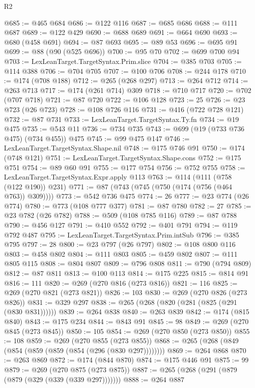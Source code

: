 \begin{lexlean}{R2}
\begin{coremodule}
@685 := @465 @684
@686 := @122 @116
@687 := @685 @686
@688 := @111 @687
@689 := @122 @429
@690 := @688 @689
@691 := @664 @690
@693 := @680 (@458 @691)
@694 := @87 @693
@695 := @89 @53
@696 := @695 @91
@699 := @88 (@90 (@525 @696))
@700 := @95 @70
@702 := @699 @700 @94
@703 := LexLeanTarget.TargetSyntax.Prim.slice
@704 := @385 @703
@705 := @114 @388
@706 := @704 @705
@707 := @100 @706
@708 := @244 @178
@710 := @174 (@708 @188)
@712 := @265 (@268 @297)
@713 := @264 @712
@714 := @263 @713
@717 := @174 (@261 @714) @309
@718 := @710 @717
@720 := @702 (@707 @718)
@721 := @87 @720
@722 := @106 @128
@723 := 25
@726 := @23 @723 (@26 @723)
@728 := @108 @726 @116
@731 := @416 (@722 @728 @121)
@732 := @87 @731
@733 := LexLeanTarget.TargetSyntax.Ty.fn
@734 := @19 @475
@735 := @543 @11
@736 := @734 @735
@743 := @699 (@19 (@733 @736 @475) (@734 @455)) @475
@745 := @99 @475 @147
@746 := LexLeanTarget.TargetSyntax.Shape.nil
@748 := @175 @746 @91
@750 := @174 (@748 @121)
@751 := LexLeanTarget.TargetSyntax.Shape.cons
@752 := @175 @751
@754 := @89 @60 @91
@755 := @177 @754
@756 := @752 @755
@758 := LexLeanTarget.TargetSyntax.Expr.apply @113
@763 := @114 (@111 (@758 (@122 @190)) @231)
@771 := @87 (@743 (@745 (@750 (@174 (@756 (@464 @763)) @309))))
@773 := @542 @736 @475
@774 := 26
@777 := @23 @774 (@26 @774)
@780 := @773 (@108 @777 @377)
@781 := @87 @780
@782 := 27
@785 := @23 @782 (@26 @782)
@788 := @509 (@108 @785 @116)
@789 := @87 @788
@790 := @456 @127
@791 := @410 @552
@792 := @401 @791
@794 := @119 @792 @487
@795 := LexLeanTarget.TargetSyntax.Prim.intSub
@796 := @385 @795
@797 := 28
@800 := @23 @797 (@26 @797)
@802 := @108 @800 @116
@803 := @458 @802
@804 := @111 @803
@805 := @459 @802
@807 := @111 @805 @115
@808 := @804 @807
@809 := @796 @808
@811 := @790 (@794 @809)
@812 := @87 @811
@813 := @100 @113
@814 := @175 @225
@815 := @814 @91
@816 := 111
@820 := @269 (@270 @816 (@273 @816))
@821 := 116
@825 := @269 (@270 @821 (@273 @821))
@826 := 103
@830 := @269 (@270 @826 (@273 @826))
@831 := @329 @297
@838 := @265 (@268 (@820 (@281 (@825 (@291 (@830 @831))))))
@839 := @264 @838
@840 := @263 @839
@842 := @174 (@815 @840)
@843 := @175 @234
@844 := @843 @91
@845 := 98
@849 := @269 (@270 @845 (@273 @845))
@850 := 105
@854 := @269 (@270 @850 (@273 @850))
@855 := 108
@859 := @269 (@270 @855 (@273 @855))
@868 := @265 (@268 (@849 (@854 (@859 (@859 (@854 (@296 (@830 @297))))))))
@869 := @264 @868
@870 := @263 @869
@872 := @174 (@844 @870)
@874 := @175 @446 @91
@875 := 99
@879 := @269 (@270 @875 (@273 @875))
@887 := @265 (@268 (@291 (@879 (@879 (@329 (@339 (@339 @297)))))))
@888 := @264 @887

\end{coremodule}
\end{lexlean}
